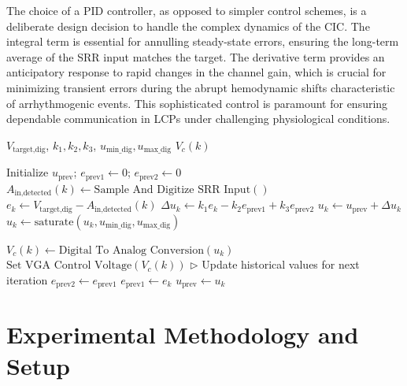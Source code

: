 \documentclass[journal]{IEEEtran}
\begin{document}
The choice of a PID controller, as opposed to simpler control schemes, is a deliberate design decision to handle the complex dynamics of the CIC. The integral term is essential for annulling steady-state errors, ensuring the long-term average of the SRR input matches the target. The derivative term provides an anticipatory response to rapid changes in the channel gain, which is crucial for minimizing transient errors during the abrupt hemodynamic shifts characteristic of arrhythmogenic events. This sophisticated control is paramount for ensuring dependable communication in LCPs under challenging physiological conditions.



\begin{algorithm}[H]
    \caption{SRR Input Stabilization Algorithm}
    \label{alg:pid_control}
    \begin{algorithmic}[1] %
        \Require
            $V_{\text{target,dig}}$, $k_1, k_2, k_3$, $u_{\text{min\_dig}}, u_{\text{max\_dig}}$
        \Ensure
            $V_c(k)$

        \State Initialize $u_{\text{prev}}$; $e_{\text{prev1}} \gets 0$; $e_{\text{prev2}} \gets 0$
            \State $A_{\text{in,detected}}(k) \gets \text{Sample And Digitize SRR Input}()$
            \State $e_k \gets V_{\text{target,dig}} - A_{\text{in,detected}}(k)$
            \State $\Delta u_k \gets k_1 e_k - k_2 e_{\text{prev1}} + k_3 e_{\text{prev2}}$
            \State $u_k \gets u_{\text{prev}} + \Delta u_k$
            \State $u_k \gets \text{saturate}(u_k, u_{\text{min\_dig}}, u_{\text{max\_dig}})$

            \State $V_c(k) \gets \text{Digital To Analog Conversion}(u_k)$
            \State $\text{Set VGA Control Voltage}(V_c(k))$
            \State \hspace{-1.5em} $\triangleright$ Update historical values for next iteration %
            \State $e_{\text{prev2}} \gets e_{\text{prev1}}$
            \State $e_{\text{prev1}} \gets e_k$
            \State $u_{\text{prev}} \gets u_k$
        \EndWhile
    \end{algorithmic}
\end{algorithm}




\section{Experimental Methodology and Setup} %
\end{document}
